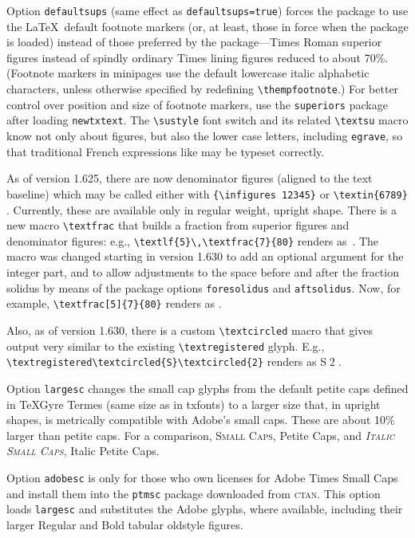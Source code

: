 \documentclass[\fsc]{article}
\theoremstyle{oldplain}
\theoremstyle{plain}
\begin{document}
Option {\tt defaultsups} (same effect as {\tt defaultsups=true}) forces the package to use the \LaTeX\ default footnote markers (or, at least, those in force when the package is loaded) instead of those preferred by the package---Times Roman superior figures instead of spindly ordinary Times lining figures reduced to about 70\%. (Footnote markers in minipages use the default lowercase italic alphabetic characters, unless otherwise specified by redefining \verb|\thempfootnote|.) For better control over position and size of footnote markers, use the {\tt superiors} package after loading {\tt newtxtext}. The \verb|\sustyle| font switch and its related \verb|\textsu| macro know not only about figures, but also the lower case letters, including \texttt{egrave}, so that traditional French expressions like  may be typeset correctly.

As of version 1.625, there are now denominator figures (aligned to the text baseline) which may be called either with \verb|{\infigures 12345}| {} or \verb|\textin{6789}| . Currently, these are available only in regular weight, upright shape. There is a new macro \verb|\textfrac| that builds a fraction from superior figures and denominator figures: e.g., \verb|\textlf{5}\,\textfrac{7}{80}| renders as \,. The macro was changed starting in version 1.630 to add an optional argument for the integer part, and to allow adjustments to the space before and after the fraction solidus by means of the package options {\tt foresolidus} and {\tt aftsolidus}. Now, for example, \verb|\textfrac[5]{7}{80}| renders as .

Also, as of version 1.630, there is a custom \verb|\textcircled| macro that gives output very similar to the existing \verb|\textregistered| glyph. E.g., \verb|\textregistered\textcircled{S}\textcircled{2}| renders as \textregistered\textcircled{S}\textcircled{2}.

Option \texttt{largesc} changes the small cap glyphs from the default petite caps defined in TeXGyre Termes (same size as in txfonts) to a larger size that, in upright shapes, is metrically compatible with Adobe's small caps. These are about 10\% larger than petite caps. For a comparison, \textsc{Small Caps}, {Petite Caps}, and \textsc{\textit{Italic Small Caps}}, {Italic Petite Caps}.

Option \texttt{adobesc} is only for those who own licenses for \textsf{Adobe Times Small Caps} and install them into the \texttt{ptmsc} package downloaded from \textsc{ctan}. This option loads \texttt{largesc} and substitutes the Adobe glyphs, where available, including their larger Regular and Bold tabular oldstyle figures.
\end{document}
